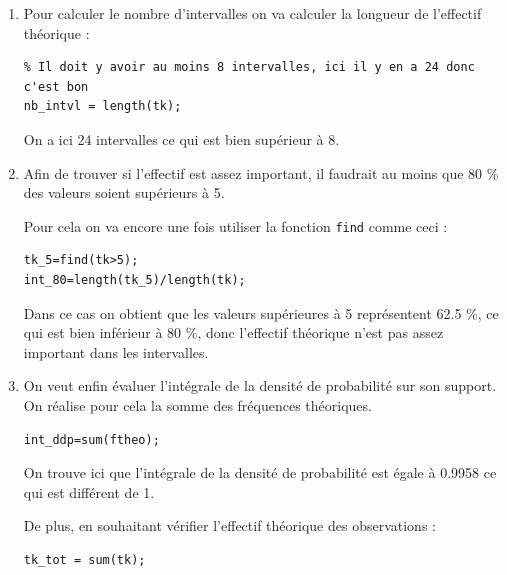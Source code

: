 \documentclass[a4paper,oneside]{article}
\begin{document}
\begin{enumerate}
\begin{center}
\begin{tabular}{|c|c|c|c|}
 \hline
\end{tabular}
 \end{center}

\item

Pour calculer le nombre d'intervalles on va calculer la longueur de l'effectif théorique :

\begin{lstlisting}
% Il doit y avoir au moins 8 intervalles, ici il y en a 24 donc c'est bon
nb_intvl = length(tk);
\end{lstlisting}

On a ici 24 intervalles ce qui est bien supérieur à 8.\\


\item

Afin de trouver si l'effectif est assez important, il faudrait au moins que 80 $\%$ des valeurs soient supérieurs à 5.

Pour cela on va encore une fois utiliser la fonction \verb?find? comme ceci : 

\begin{lstlisting}
tk_5=find(tk>5);
int_80=length(tk_5)/length(tk);
\end{lstlisting}

Dans ce cas on obtient que les valeurs supérieures à 5 représentent 62.5 $\%$, ce qui est bien inférieur à 80 $\%$, donc l'effectif théorique n'est pas assez important dans les intervalles.

\newpage

\item
On veut enfin évaluer l'intégrale de la densité de probabilité sur son support. On réalise pour cela la somme des fréquences théoriques.

\begin{lstlisting}
int_ddp=sum(ftheo);

\end{lstlisting}

On trouve ici que l'intégrale de la densité de probabilité est égale à 0.9958 ce qui est différent de 1.

De plus, en souhaitant vérifier l'effectif théorique des observations :

\begin{lstlisting}
tk_tot = sum(tk);

\end{lstlisting}


\end{enumerate}
\end{document}
